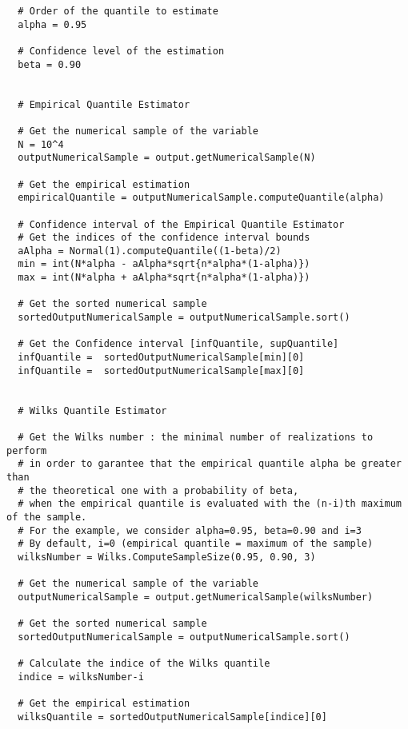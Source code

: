 \begin{lstlisting}
  # Order of the quantile to estimate
  alpha = 0.95

  # Confidence level of the estimation
  beta = 0.90


  # Empirical Quantile Estimator

  # Get the numerical sample of the variable
  N = 10^4
  outputNumericalSample = output.getNumericalSample(N)

  # Get the empirical estimation
  empiricalQuantile = outputNumericalSample.computeQuantile(alpha)

  # Confidence interval of the Empirical Quantile Estimator
  # Get the indices of the confidence interval bounds
  aAlpha = Normal(1).computeQuantile((1-beta)/2)
  min = int(N*alpha - aAlpha*sqrt{n*alpha*(1-alpha)})
  max = int(N*alpha + aAlpha*sqrt{n*alpha*(1-alpha)})

  # Get the sorted numerical sample
  sortedOutputNumericalSample = outputNumericalSample.sort()

  # Get the Confidence interval [infQuantile, supQuantile]
  infQuantile =  sortedOutputNumericalSample[min][0]
  infQuantile =  sortedOutputNumericalSample[max][0]


  # Wilks Quantile Estimator

  # Get the Wilks number : the minimal number of realizations to perform
  # in order to garantee that the empirical quantile alpha be greater than
  # the theoretical one with a probability of beta,
  # when the empirical quantile is evaluated with the (n-i)th maximum of the sample.
  # For the example, we consider alpha=0.95, beta=0.90 and i=3
  # By default, i=0 (empirical quantile = maximum of the sample)
  wilksNumber = Wilks.ComputeSampleSize(0.95, 0.90, 3)

  # Get the numerical sample of the variable
  outputNumericalSample = output.getNumericalSample(wilksNumber)

  # Get the sorted numerical sample
  sortedOutputNumericalSample = outputNumericalSample.sort()

  # Calculate the indice of the Wilks quantile
  indice = wilksNumber-i

  # Get the empirical estimation
  wilksQuantile = sortedOutputNumericalSample[indice][0]
\end{lstlisting}



